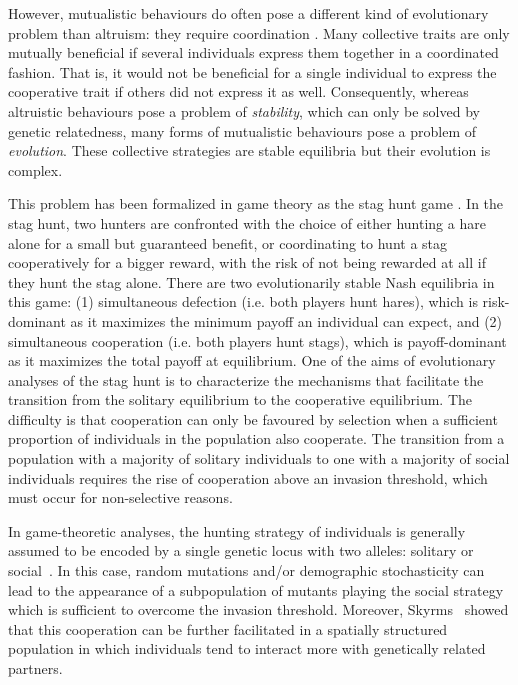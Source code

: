     However, mutualistic behaviours do often pose a different kind of evolutionary problem than altruism: they require coordination \cite{Alvard2001, Alvard2003, Drea2009, Leimar2003}. Many collective traits are only mutually beneficial if several individuals express them together in a coordinated fashion. That is, it would not be beneficial for a single individual to express the cooperative trait if others did not express it as well. Consequently, whereas altruistic behaviours pose a problem of \textit{stability}, which can only be solved by genetic relatedness, many forms of mutualistic behaviours pose a problem of \textit{evolution}. These collective strategies are stable equilibria but their evolution is complex. 

    This problem has been formalized in game theory as the stag hunt game \cite{Skyrms2004}. In the stag hunt, two hunters are confronted with the choice of either hunting a hare alone for a small but guaranteed benefit, or coordinating to hunt a stag cooperatively for a bigger reward, with the risk of not being rewarded at all if they hunt the stag alone. There are two evolutionarily stable Nash equilibria in this game: (1) simultaneous defection (i.e. both players hunt hares), which is risk-dominant as it maximizes the minimum payoff an individual can expect, and (2) simultaneous cooperation (i.e. both players hunt stags), which is payoff-dominant as it maximizes the total payoff at equilibrium. One of the aims of evolutionary analyses of the stag hunt is to characterize the mechanisms that facilitate the transition from the solitary equilibrium to the cooperative equilibrium. The difficulty is that cooperation can only be favoured by selection when a sufficient proportion of individuals in the population also cooperate. The transition from a population with a majority of solitary individuals to one with a majority of social individuals requires the rise of cooperation above an invasion threshold, which must occur for non-selective reasons.

    In game-theoretic analyses, the hunting strategy of individuals is generally assumed to be encoded by a single genetic locus with two alleles: solitary or social~\cite{Skyrms2004}. In this case, random mutations and/or demographic stochasticity can lead to the appearance of a subpopulation of mutants playing the social strategy which is sufficient to overcome the invasion threshold. Moreover, Skyrms~\cite{Skyrms2004} showed that this cooperation can be further facilitated in a spatially structured population in which individuals tend to interact more with genetically related partners. 

